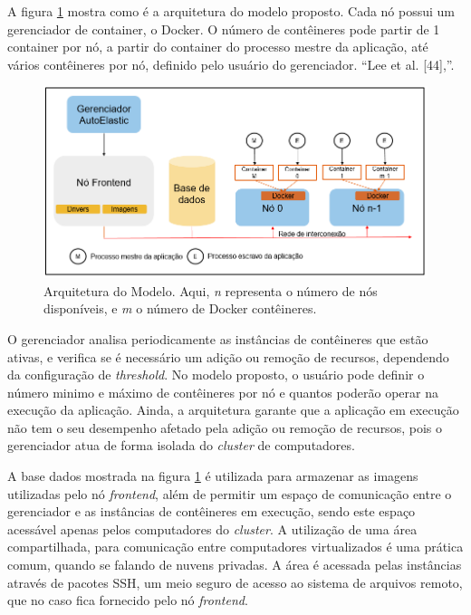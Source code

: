 \documentclass[twoside,english,brazilian]{UNISINOSartigo}
\begin{document}
\begin{itemize}
A figura \ref{fig:arquitetura} mostra como é a arquitetura do modelo proposto. Cada nó possui um gerenciador de container, o Docker. O número de contêineres pode partir de 1 container por nó, a partir do container do processo mestre da aplicação, até vários contêineres por nó, definido pelo usuário do gerenciador. ``Lee
et al. [44],''.  

\begin{figure}
	\caption{Arquitetura do Modelo. Aqui, \textit{n} representa o número de nós disponíveis, e \textit{m} o número de Docker contêineres.}
	\label{fig:arquitetura}
	\centering%
	\begin{minipage}{0.8\textwidth}
		\includegraphics[width=\textwidth]{arquitetura}
	\end{minipage}
\end{figure}

O gerenciador analisa periodicamente as instâncias de contêineres que estão ativas, e verifica se é necessário um adição ou remoção de recursos, dependendo da configuração de \textit{threshold}. No modelo proposto, o usuário pode definir o número minimo e máximo de contêineres por nó e quantos poderão operar na execução da aplicação. Ainda, a arquitetura garante que a aplicação em execução não tem o seu desempenho afetado pela adição ou remoção de recursos, pois o gerenciador atua de forma isolada do \textit{cluster} de computadores. 

A base dados mostrada na figura \ref{fig:arquitetura} é utilizada para armazenar as imagens utilizadas pelo nó \textit{frontend}, além de permitir um espaço de comunicação entre o gerenciador e as instâncias de contêineres em execução, sendo este espaço acessável apenas pelos computadores do \textit{cluster}. A utilização de uma área compartilhada, para comunicação entre computadores virtualizados é uma prática comum, quando se falando de nuvens privadas. A área é acessada pelas instâncias através de pacotes SSH, um meio seguro de acesso ao sistema de arquivos remoto, que no caso fica fornecido pelo nó \textit{frontend}.


\end{itemize}
\end{document}
